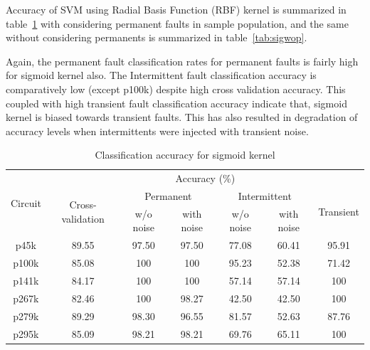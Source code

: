Accuracy of SVM using Radial Basis Function (RBF) kernel is summarized in table~\ref{tab:sigwp} with considering permanent faults in sample population, and the same without considering permanents is summarized in table~\ref{tab:sigwop}.

Again, the permanent fault classification rates for permanent faults is fairly high for sigmoid kernel also. The Intermittent fault classification accuracy is comparatively low (except p100k) despite high cross validation accuracy. This coupled with high transient fault classification accuracy indicate that, sigmoid kernel is biased towards transient faults. This has also resulted in degradation of accuracy levels when intermittents were injected with transient noise.

\begin{table}[h]

	\captionsetup{justification=centering}
\begin{tabular}{ccccccc}
\hline
\multirow{3}{*}{Circuit} & \multicolumn{6}{c}{Accuracy (\%)}\\ \cline{2-7} 
                         & \multirow{2}{*}{Cross-validation} & \multicolumn{2}{c}{Permanent} & \multicolumn{2}{c}{Intermittent} & \multirow{2}{*}{Transient} \\ \cline{3-6}
                         &                                   & w/o noise     & with noise    & w/o noise      & with noise      &                            \\ \hline
p45k                     & 89.55                             & 97.50         & 97.50         & 77.08          & 60.41           & 95.91                      \\
p100k                    & 85.08                             & 100           & 100           & 95.23          & 52.38           & 71.42                      \\
p141k                    & 84.17                             & 100           & 100           & 57.14          & 57.14           & 100                        \\
p267k                    & 82.46                             & 100           & 98.27         & 42.50          & 42.50           & 100                        \\
p279k                    & 89.29                             & 98.30         & 96.55         & 81.57          & 52.63           & 87.76                      \\
p295k                    & 85.09                             & 98.21         & 98.21         & 69.76          & 65.11           & 100                       \\
\hline                                                     
\end{tabular}
\caption {Classification accuracy for sigmoid kernel}
\label{tab:sigwp}
\end{table}


